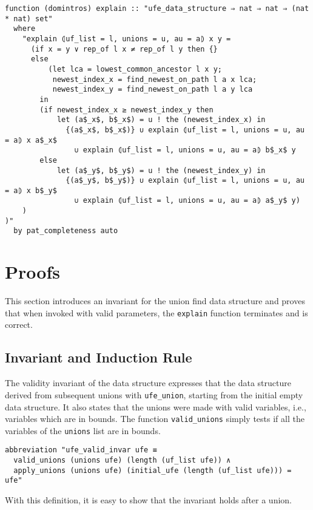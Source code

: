 \begin{lstlisting}
function (domintros) explain :: "ufe_data_structure ⇒ nat ⇒ nat ⇒ (nat * nat) set"
  where
    "explain ⦇uf_list = l, unions = u, au = a⦈ x y =
      (if x = y ∨ rep_of l x ≠ rep_of l y then {}
      else
          (let lca = lowest_common_ancestor l x y;
           newest_index_x = find_newest_on_path l a x lca;
           newest_index_y = find_newest_on_path l a y lca
        in
        (if newest_index_x ≥ newest_index_y then
            let (a$_x$, b$_x$) = u ! the (newest_index_x) in
              {(a$_x$, b$_x$)} ∪ explain ⦇uf_list = l, unions = u, au = a⦈ x a$_x$
                ∪ explain ⦇uf_list = l, unions = u, au = a⦈ b$_x$ y
        else
            let (a$_y$, b$_y$) = u ! the (newest_index_y) in
              {(a$_y$, b$_y$)} ∪ explain ⦇uf_list = l, unions = u, au = a⦈ x b$_y$
                ∪ explain ⦇uf_list = l, unions = u, au = a⦈ a$_y$ y)
    )
)"
  by pat_completeness auto
\end{lstlisting}



\section{Proofs}

This section introduces an invariant for the union find data structure and proves that  when invoked with valid parameters, the \lstinline{explain} function terminates and is correct.

\subsection{Invariant and Induction Rule}\label{subsection:invariant}

The validity invariant of the data structure expresses that the data structure derived from subsequent unions with \lstinline{ufe_union}, starting from the initial empty data structure.
It also states that the unions were made with valid variables, i.e., variables which are in bounds.
The function \lstinline|valid_unions| simply tests if all the variables of the \lstinline|unions| list are in bounds.

\begin{lstlisting}
abbreviation "ufe_valid_invar ufe ≡
  valid_unions (unions ufe) (length (uf_list ufe)) ∧
  apply_unions (unions ufe) (initial_ufe (length (uf_list ufe))) = ufe"
\end{lstlisting}

With this definition, it is easy to show that the invariant holds after a union.

